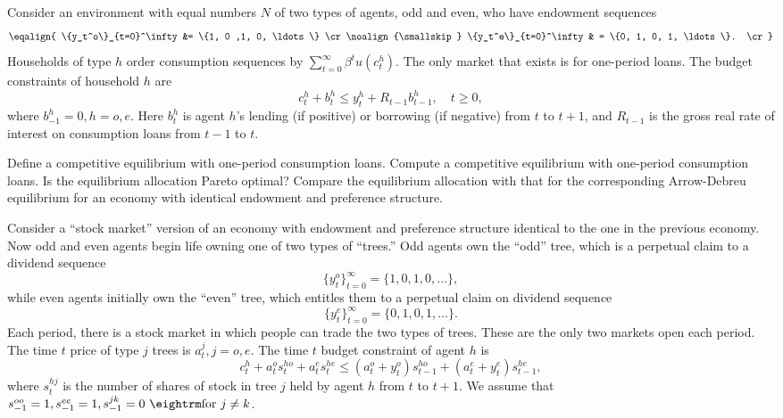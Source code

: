\medskip

\medskip\noindent
  Consider an environment with equal
numbers $N$ of two types of agents, odd and even, who have endowment sequences
 $$\eqalign{ \{y_t^o\}_{t=0}^\infty &= \{1, 0 ,1, 0, \ldots \} \cr
\noalign{\smallskip}
           \{y_t^e\}_{t=0}^\infty & = \{0, 1, 0, 1, \ldots \}. \cr}$$
Households of type $h$ order consumption sequences
by $\sum_{t=0}^\infty \beta^t u(c_t^h)$. The only market
that exists is for one-period loans.  The budget constraints
of household $h$ are
$$ c_t^h + b_t^h \leq y_t^h + R_{t-1} b_{t-1}^h ,\quad t \geq 0,$$
where $b_{-1}^h = 0, h=o,e$.  Here $b_t^h$ is agent $h$'s
lending (if positive) or borrowing (if negative) from
$t$ to $t+1$, and $R_{t-1}$ is the gross real rate of interest
on consumption loans from $t-1$ to $t$.

\medskip
{}  Define a competitive equilibrium with
one-period consumption loans.
\medskip
{}  Compute a competitive equilibrium with
one-period consumption loans.
\medskip
{}  Is the equilibrium
allocation Pareto optimal?  Compare the equilibrium
allocation with that for the corresponding Arrow-Debreu
equilibrium for an economy with identical endowment
and preference structure.


\medskip
{}
\medskip\noindent
  Consider a ``stock market'' version of an
economy with endowment and preference structure identical
to the one in the previous economy.  Now odd and even
agents begin life owning one of two types of ``trees.''  Odd
agents own the ``odd'' tree, which is a perpetual
claim to a dividend sequence
$$ \{y_t^o\}_{t=0}^\infty = \{ 1, 0, 1, 0, \ldots \} ,$$
while even agents initially own the
``even'' tree, which entitles them to a perpetual claim on
dividend sequence
$$ \{y_t^e\}_{t=0}^\infty = \{0, 1, 0, 1, \ldots \}.$$
Each period, there is a stock market in which
people can trade the two types of trees.  These are the
only two markets open each period. The time $t$ price
of type $j$ trees is $a_t^j, j=o,e$.
The time $t$ budget constraint of agent $h$ is
$$ c_t^h + a_t^o s_t^{ho} + a_t^e s_t^{he} \leq
      ( a_t^o + y_t^o) s_{t-1}^{ho} + (a_t^e + y_t^e) s_{t-1}^{he} ,$$
where $s_t^{hj}$ is the number of shares of
stock in tree $j$ held by agent $h$ from $t$ to $t+1$.
We assume that $s_{-1}^{oo} = 1, s_{-1}^{ee} = 1,
s_{-1}^{jk} = 0 \ {\rm for} \ j \neq k$.

